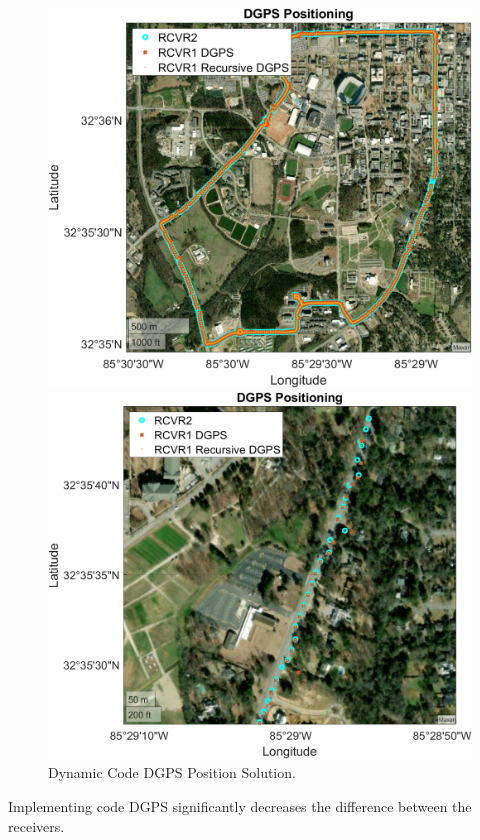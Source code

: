 \documentclass[11pt]{article}
\begin{document}
\begin{enumerate}[label=\textbf{\arabic*.}]
\begin{figure}[H]
\begin{minipage}[b]{0.49\textwidth}
          \includegraphics[width=\textwidth]{p3_b.png}
        \end{minipage}
        \begin{minipage}[b]{0.49\textwidth}
          \includegraphics[width=\textwidth]{p3_b1.png}
        \end{minipage}
        \caption{Dynamic Code DGPS Position Solution.}
      \end{figure}
      Implementing code DGPS significantly decreases the difference between the receivers. 

\end{enumerate}
\end{document}
